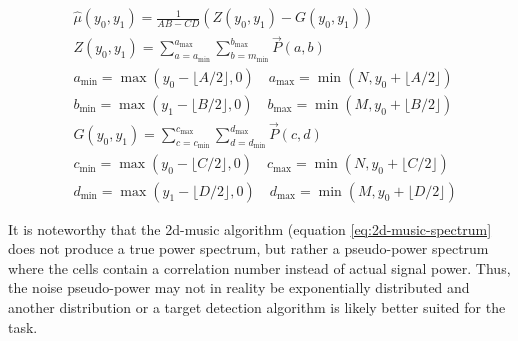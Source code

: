 \begin{align}
    \label{eq:ca-cfar-noise-estimate}
    & \hat \mu (y_0, y_1) = \frac{1}{AB-CD} \left( Z(y_0, y_1) - G(y_0, y_1) \right)
    \\
    \label{eq:observation-window-sum}
    & Z(y_0, y_1) = \sum_{a=a_{\mathrm{min}}}^{a_{\mathrm{max}}}\sum_{b=m_{\mathrm{min}}}^{b_{\mathrm{max}}} \vec{P}(a, b) 
    \\
    & a_{\mathrm{min}} = \max \left( y_{0}- \lfloor A/2 \rfloor , 0 \right) \quad a_{\mathrm{max}} = \min \left( N, y_{0}+ \lfloor A/2 \rfloor \right)
    \\
    & b_{\mathrm{min}} = \max \left( y_{1}- \lfloor B/2 \rfloor , 0 \right) \quad b_{\mathrm{max}} = \min \left( M, y_{0}+ \lfloor B/2 \rfloor  \right)
    \\
    \label{eq:guard-window-sum}
    & G(y_0, y_1) = \sum_{c=c_{\mathrm{min}}}^{c_{\mathrm{max}}}\sum_{d=d_{\mathrm{min}}}^{d_{\mathrm{max}}} \vec{P}(c, d) 
    \\
    & c_{\mathrm{min}} = \max \left( y_{0}- \lfloor C/2 \rfloor , 0 \right) \quad c_{\mathrm{max}} = \min \left( N, y_{0}+ \lfloor C/2 \rfloor  \right)
    \\
    & d_{\mathrm{min}} = \max \left( y_{1}- \lfloor D/2 \rfloor , 0 \right) \quad d_{\mathrm{max}} = \min \left( M, y_{0}+ \lfloor D/2 \rfloor  \right)
\end{align}

It is noteworthy that the \gls{2d-music} algorithm (equation \ref{eq:2d-music-spectrum} does not produce a true power spectrum,
but rather a pseudo-power spectrum where the cells contain a correlation number instead of actual signal power.
Thus, the noise pseudo-power may not in reality be exponentially distributed and another distribution or a target detection algorithm
is likely better suited for the task.

